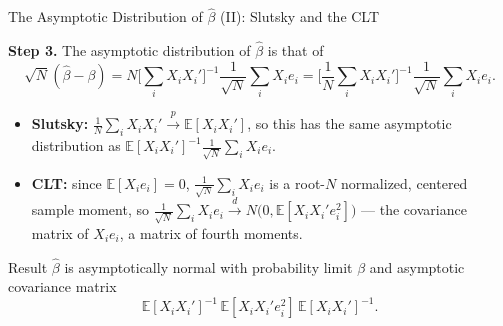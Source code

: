 \documentclass[aspectratio=169,11pt]{beamer}
\newcommand{\E}{\mathbb{E}}
\newcommand{\pto}{\xrightarrow{\;p\;}}
\newcommand{\dto}{\xrightarrow{\;d\;}}
\begin{document}
\begin{frame}{The Asymptotic Distribution of $\hat\beta$ (II): Slutsky and the CLT}
\small

\textbf{Step 3.} The asymptotic distribution of $\hat\beta$ is that of
\[
\sqrt N(\hat\beta-\beta)
= N\Big[\sum_iX_iX_i'\Big]^{-1}\frac{1}{\sqrt N}\sum_iX_ie_i
= \Big[\frac1N\sum_iX_iX_i'\Big]^{-1}\frac{1}{\sqrt N}\sum_iX_ie_i.
\]
\begin{itemize}
    \item \textbf{Slutsky:} $\frac1N\sum_iX_iX_i'\pto\E[X_iX_i']$, so this has
    the same asymptotic distribution as
    $\E[X_iX_i']^{-1}\frac{1}{\sqrt N}\sum_iX_ie_i$.
    \item \textbf{CLT:} since $\E[X_ie_i]=0$,
    $\frac{1}{\sqrt N}\sum_iX_ie_i$ is a root-$N$ normalized, centered sample
    moment, so
    $\frac{1}{\sqrt N}\sum_iX_ie_i\dto N\big(0,\E[X_iX_i'e_i^2]\big)$ ---
    the covariance matrix of $X_ie_i$, a matrix of fourth moments.
\end{itemize}

\medskip

\begin{block}{Result}
$\hat\beta$ is asymptotically normal with probability limit $\beta$ and
asymptotic covariance matrix
\[
\E[X_iX_i']^{-1}\,\E[X_iX_i'e_i^2]\,\E[X_iX_i']^{-1}.
\tag{3.1.7}
\]
\end{block}

\end{frame}
\end{document}
